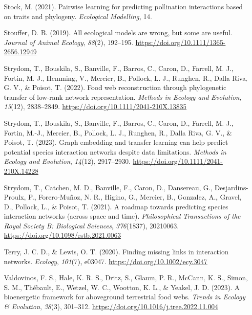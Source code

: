 \documentclass[
]{article}
\newlength{\cslhangindent}
\newenvironment{CSLReferences}[2] %
 {\begin{list}{}{%
  \setlength{\itemindent}{0pt}
  \setlength{\leftmargin}{0pt}
  \setlength{\parsep}{0pt}
  \ifodd #1
   \setlength{\leftmargin}{\cslhangindent}
   \setlength{\itemindent}{-1\cslhangindent}
  \fi
  \setlength{\itemsep}{#2\baselineskip}}}
 {\end{list}}
\begin{document}
\begin{CSLReferences}{1}{0}
Stock, M. (2021). Pairwise learning for predicting pollination
interactions based on traits and phylogeny. \emph{Ecological Modelling},
14.

Stouffer, D. B. (2019). All ecological models are wrong, but some are
useful. \emph{Journal of Animal Ecology}, \emph{88}(2), 192--195.
\url{https://doi.org/10.1111/1365-2656.12949}

Strydom, T., Bouskila, S., Banville, F., Barros, C., Caron, D., Farrell,
M. J., Fortin, M.-J., Hemming, V., Mercier, B., Pollock, L. J., Runghen,
R., Dalla Riva, G. V., \& Poisot, T. (2022). Food web reconstruction
through phylogenetic transfer of low-rank network representation.
\emph{Methods in Ecology and Evolution}, \emph{13}(12), 2838--2849.
\url{https://doi.org/10.1111/2041-210X.13835}

Strydom, T., Bouskila, S., Banville, F., Barros, C., Caron, D., Farrell,
M. J., Fortin, M.-J., Mercier, B., Pollock, L. J., Runghen, R., Dalla
Riva, G. V., \& Poisot, T. (2023). Graph embedding and transfer learning
can help predict potential species interaction networks despite data
limitations. \emph{Methods in Ecology and Evolution}, \emph{14}(12),
2917--2930. \url{https://doi.org/10.1111/2041-210X.14228}

Strydom, T., Catchen, M. D., Banville, F., Caron, D., Dansereau, G.,
Desjardins-Proulx, P., Forero-Muñoz, N. R., Higino, G., Mercier, B.,
Gonzalez, A., Gravel, D., Pollock, L., \& Poisot, T. (2021). A roadmap
towards predicting species interaction networks (across space and time).
\emph{Philosophical Transactions of the Royal Society B: Biological
Sciences}, \emph{376}(1837), 20210063.
\url{https://doi.org/10.1098/rstb.2021.0063}

Terry, J. C. D., \& Lewis, O. T. (2020). Finding missing links in
interaction networks. \emph{Ecology}, \emph{101}(7), e03047.
\url{https://doi.org/10.1002/ecy.3047}

Valdovinos, F. S., Hale, K. R. S., Dritz, S., Glaum, P. R., McCann, K.
S., Simon, S. M., Thébault, E., Wetzel, W. C., Wootton, K. L., \&
Yeakel, J. D. (2023). A bioenergetic framework for aboveground
terrestrial food webs. \emph{Trends in Ecology \& Evolution},
\emph{38}(3), 301--312. \url{https://doi.org/10.1016/j.tree.2022.11.004}


\end{CSLReferences}
\end{document}
